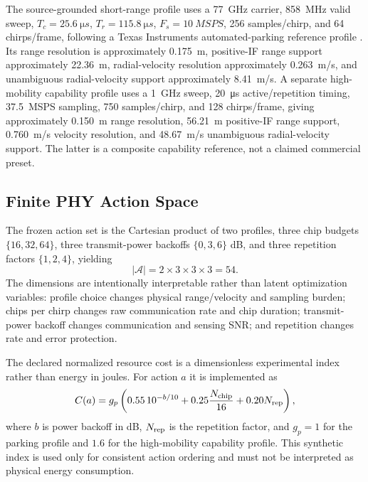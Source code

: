 \documentclass[journal]{IEEEtran}
\begin{document}
The source-grounded short-range profile uses a \SI{77}{GHz} carrier, \SI{858}{MHz} valid sweep, $T_c=\SI{25.6}{\micro s}$, $T_r=\SI{115.8}{\micro s}$, $F_s=\SI{10}{MSPS}$, 256 samples/chirp, and 64 chirps/frame, following a Texas Instruments automated-parking reference profile \cite{tiParking}. Its range resolution is approximately \SI{0.175}{m}, positive-IF range support approximately \SI{22.36}{m}, radial-velocity resolution approximately \SI{0.263}{m/s}, and unambiguous radial-velocity support approximately \SI{8.41}{m/s}. A separate high-mobility capability profile uses a \SI{1}{GHz} sweep, \SI{20}{\micro s} active/repetition timing, \SI{37.5}{MSPS} sampling, 750 samples/chirp, and 128 chirps/frame, giving approximately \SI{0.150}{m} range resolution, \SI{56.21}{m} positive-IF range support, \SI{0.760}{m/s} velocity resolution, and \SI{48.67}{m/s} unambiguous radial-velocity support. The latter is a composite capability reference, not a claimed commercial preset.

\subsection{Finite PHY Action Space}
The frozen action set is the Cartesian product of two profiles, three chip budgets $\{16,32,64\}$, three transmit-power backoffs $\{0,3,6\}$ dB, and three repetition factors $\{1,2,4\}$, yielding
\begin{equation}
 |\mathcal{A}|=2\times3\times3\times3=54.
\end{equation}
The dimensions are intentionally interpretable rather than latent optimization variables: profile choice changes physical range/velocity and sampling burden; chips per chirp changes raw communication rate and chip duration; transmit-power backoff changes communication and sensing SNR; and repetition changes rate and error protection.

The declared normalized resource cost is a dimensionless experimental index rather than energy in joules. For action $a$ it is implemented as
\begin{equation}
 C(a)=g_p\left(0.55\,10^{-b/10}+0.25\frac{N_{\rm chip}}{16}+0.20N_{\rm rep}\right),
\end{equation}
where $b$ is power backoff in dB, $N_{\rm rep}$ is the repetition factor, and $g_p=1$ for the parking profile and $1.6$ for the high-mobility capability profile. This synthetic index is used only for consistent action ordering and must not be interpreted as physical energy consumption.
\end{document}
